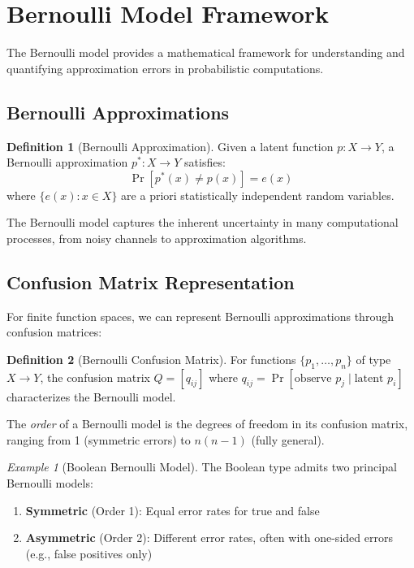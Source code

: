 \documentclass[11pt]{article}
\theoremstyle{definition}
\newtheorem{definition}{Definition}[section]
\theoremstyle{plain}
\theoremstyle{remark}
\newtheorem{example}{Example}[section]
\begin{document}
\section{Bernoulli Model Framework}
\label{sec:bernoulli}

The Bernoulli model provides a mathematical framework for understanding and quantifying approximation errors in probabilistic computations.

\subsection{Bernoulli Approximations}

\begin{definition}[Bernoulli Approximation]
\label{def:bernoulli-approx}
Given a latent function $p : X \to Y$, a Bernoulli approximation $p^* : X \to Y$ satisfies:
$$\Pr[p^*(x) \neq p(x)] = e(x)$$
where $\{e(x) : x \in X\}$ are a priori statistically independent random variables.
\end{definition}

The Bernoulli model captures the inherent uncertainty in many computational processes, from noisy channels to approximation algorithms.

\subsection{Confusion Matrix Representation}

For finite function spaces, we can represent Bernoulli approximations through confusion matrices:

\begin{definition}[Bernoulli Confusion Matrix]
For functions $\{p_1, \ldots, p_n\}$ of type $X \to Y$, the confusion matrix $Q = [q_{ij}]$ where $q_{ij} = \Pr[\text{observe } p_j \mid \text{latent } p_i]$ characterizes the Bernoulli model.
\end{definition}

The \emph{order} of a Bernoulli model is the degrees of freedom in its confusion matrix, ranging from 1 (symmetric errors) to $n(n-1)$ (fully general).

\begin{example}[Boolean Bernoulli Model]
The Boolean type admits two principal Bernoulli models:
\begin{enumerate}
\item \textbf{Symmetric} (Order 1): Equal error rates for true and false
\item \textbf{Asymmetric} (Order 2): Different error rates, often with one-sided errors (e.g., false positives only)
\end{enumerate}
\end{example}
\end{document}
